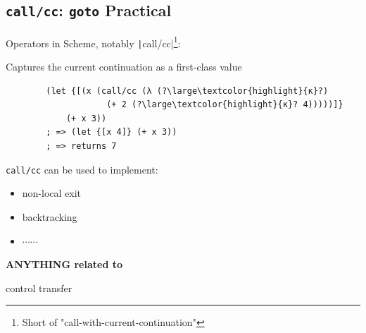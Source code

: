 \subsection{\texttt{call/cc}: \texttt{goto} Practical}
\begin{frame}[fragile]
	\frametitlesubs

	Operators in Scheme\cite{sussman1975scheme}, notably \texttt|call/cc|\cite{scheme1978revised}\footnote{Short of "call-with-current-continuation"}:

	Captures the current continuation as a first-class value

	\begin{center}
		\vspace*{-1.2\baselineskip}
		\begin{minipage}[t]{.55\textwidth}
			\begin{verbatim}
        (let {[(x (call/cc (λ (?\large\textcolor{highlight}{κ}?)
                    (+ 2 (?\large\textcolor{highlight}{κ}? 4)))))]}
            (+ x 3))
        ; => (let {[x 4]} (+ x 3))
        ; => returns 7
      \end{verbatim}
		\end{minipage}
		\vspace*{-.4\baselineskip}
	\end{center}

	\pause
	\texttt{call/cc} can be used to implement:

	\begin{minipage}{.3\textwidth}
		\begin{itemize}
			\item[\emoji{check-mark-button}] non-local exit
			\item[\emoji{check-mark-button}] backtracking
			\item[] $\cdots\cdots$
		\end{itemize}
	\end{minipage}
	\begin{minipage}{.64\textwidth}
		\pause
		{\Huge {}}
		\Large
		\parbox{.85\textwidth}{%
			\color{highlight}
			\bf
			\centering
			ANYTHING related to

			\boldslant control transfer%
		}
	\end{minipage}
\end{frame}


